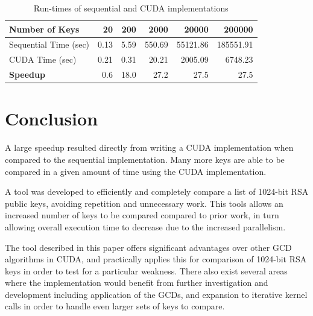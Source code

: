 \documentclass[12pt]{ucthesis}
\begin{document}
\begin{table}
   \label{tab:runtimes}
   \centering
   \begin{tabular}{|l|*{5}{r}|}\hline
      Number of Keys        & 20   & 200  & 2000   & 20000    & 200000 \\ \hline
      Sequential Time (sec) & 0.13 & 5.59 & 550.69 & 55121.86 & 185551.91\\
      CUDA Time (sec)       & 0.21 & 0.31 & 20.21  & 2005.09  & 6748.23\\\hline
      \textbf{Speedup}      & 0.6  & 18.0 & 27.2   & 27.5     & 27.5\\\hline
   \end{tabular}
   \caption{Run-times of sequential and CUDA implementations}
\end{table}


\section{Conclusion}
\label{sec:concl}
A large speedup resulted directly from writing a CUDA 
implementation when compared to the sequential implementation. Many 
more keys are able to be compared in a given amount of time using the CUDA
implementation. 

A tool was developed to efficiently and completely compare a list of 1024-bit 
RSA public keys, avoiding repetition and unnecessary work. This 
tools allows an increased number of keys to be compared 
compared to prior work, in turn allowing overall execution time to decrease due 
to the increased parallelism.

The tool described in this paper offers significant advantages over other GCD 
algorithms in CUDA, and practically applies this for comparison of 1024-bit 
RSA keys in order to test for a particular weakness. There also exist 
several areas where the implementation would benefit from further 
investigation and development including application of the GCDs, and 
expansion to iterative kernel calls in order to handle even larger sets of 
keys to compare.
\end{document}
